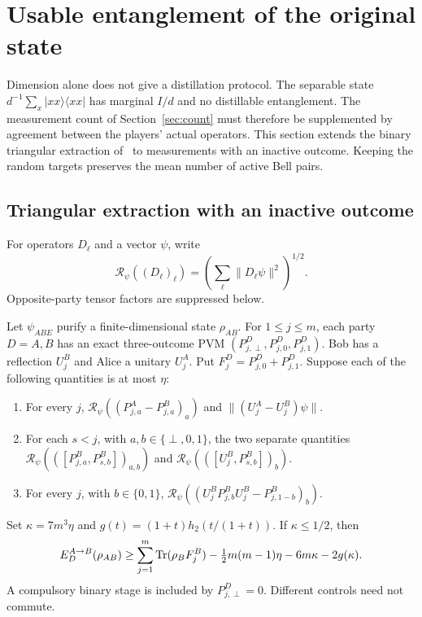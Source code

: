 \section{Usable entanglement of the original state}\label{sec:usable}
Dimension alone does not give a distillation protocol. The separable state $d^{-1}\sum_x|xx\rangle\langle xx|$ has marginal $I/d$ and no distillable entanglement. The measurement count of Section~\ref{sec:count} must therefore be supplemented by agreement between the players' actual operators. This section extends the binary triangular extraction of~\cite[Theorem~6.2]{DM-precision} to measurements with an inactive outcome. Keeping the random targets preserves the mean number of active Bell pairs.

\subsection{Triangular extraction with an inactive outcome}
For operators $D_\ell$ and a vector $\psi$, write
\[
 \mathcal R_\psi((D_\ell)_\ell)
 =\left(\sum_\ell\|D_\ell\psi\|^2\right)^{1/2}.
\]
Opposite-party tensor factors are suppressed below.
\begin{lemma}\label{lem:inactive-extraction}
Let $\psi_{ABE}$ purify a finite-dimensional state $\rho_{AB}$. For $1\le j\le m$, each party $D=A,B$ has an exact three-outcome PVM $(P^D_{j,\perp},P^D_{j,0},P^D_{j,1})$. Bob has a reflection $U_j^B$ and Alice a unitary $U_j^A$. Put $F_j^D=P^D_{j,0}+P^D_{j,1}$. Suppose each of the following quantities is at most $\eta$:
\begin{enumerate}[label=(\roman*),leftmargin=*]
\item For every $j$, $\mathcal R_\psi((P^A_{j,a}-P^B_{j,a})_a)$ and $\|(U_j^A-U_j^B)\psi\|$.
\item For each $s<j$, with $a,b\in\{\perp,0,1\}$, the two separate quantities $\mathcal R_\psi(([P^B_{j,a},P^B_{s,b}])_{a,b})$ and $\mathcal R_\psi(([U_j^B,P^B_{s,b}])_b)$.
\item For every $j$, with $b\in\{0,1\}$, $\mathcal R_\psi((U_j^BP^B_{j,b}U_j^B-P^B_{j,1-b})_b)$.
\end{enumerate}
Set $\kappa=7m^3\eta$ and $g(t)=(1+t)h_2(t/(1+t))$. If $\kappa\le1/2$, then
\begin{equation}\label{eq:inactive-extraction}
 E_D^{A\to B}(\rho_{AB})\ge
 \sum_{j=1}^m\operatorname{Tr}(\rho_BF_j^B)
 -\tfrac12m(m-1)\eta-6m\kappa-2g(\kappa).
\end{equation}
A compulsory binary stage is included by $P^D_{j,\perp}=0$. Different controls need not commute.
\end{lemma}

